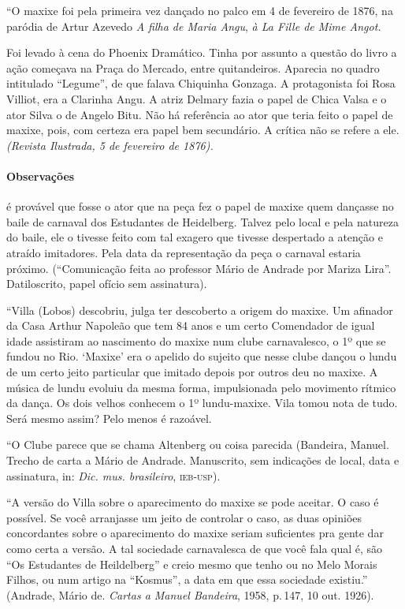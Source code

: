 ``O maxixe foi pela primeira vez dançado no palco em 4 de fevereiro de
1876, na paródia de Artur Azevedo \textit{A filha de Maria Angu}, \textit{à
La Fille de Mime Angot.}

Foi levado à cena do Phoenix Dramático. Tinha por assunto a questão do
livro a ação começava na Praça do Mercado, entre quitandeiros. Aparecia
no quadro intitulado ``Legume'', de que falava Chiquinha Gonzaga. A
protagonista foi Rosa Villiot, era a Clarinha Angu. A atriz Delmary
fazia o papel de Chica Valsa e o ator Silva o de Angelo Bitu. Não há
referência ao ator que teria feito o papel de maxixe, pois, com certeza
era papel bem secundário. A crítica não se refere a ele. \textit{(Revista
Ilustrada, 5 de fevereiro de 1876).}

\paragraph{Observações} é provável que fosse o ator que na peça fez o papel de
maxixe quem dançasse no baile de carnaval dos Estudantes de Heidelberg.
Talvez pelo local e pela natureza do baile, ele o tivesse feito com tal
exagero que tivesse despertado a atenção e atraído imitadores. Pela data
da representação da peça o carnaval estaria próximo. (``Comunicação
feita ao professor Mário de Andrade por Mariza Lira''. Datiloscrito,
papel ofício sem assinatura).

``Villa (Lobos) descobriu, julga ter descoberto a origem do maxixe. Um
afinador da Casa Arthur Napoleão que tem 84 anos e um certo Comendador
de igual idade assistiram ao nascimento do maxixe num clube
carnavalesco, o 1º que se fundou no Rio. `Maxixe' era o apelido do
sujeito que nesse clube dançou o lundu de um certo jeito particular que
imitado depois por outros deu no maxixe. A música de lundu evoluiu da
mesma forma, impulsionada pelo movimento rítmico da dança. Os dois
velhos conhecem o 1º lundu-maxixe. Vila tomou nota de tudo. Será mesmo
assim? Pelo menos é razoável.

``O Clube parece que se chama Altenberg ou coisa parecida (Bandeira,
Manuel. Trecho de carta a Mário de Andrade. Manuscrito, sem indicações
de local, data e assinatura, in: \textit{Dic. mus. brasileiro}, \textsc{ieb-usp}).

``A versão do Villa sobre o aparecimento do maxixe se pode aceitar. O
caso é possível. Se você arranjasse um jeito de controlar o caso, as
duas opiniões concordantes sobre o aparecimento do maxixe seriam
suficientes pra gente dar como certa a versão. A tal sociedade
carnavalesca de que você fala qual é, são ``Os Estudantes de Heildelberg''
e creio mesmo que tenho ou no Melo Morais Filhos, ou num artigo na
``Kosmus'', a data em que essa sociedade existiu.'' (Andrade, Mário de.
\textit{Cartas a Manuel Bandeira}, 1958, p.\,147, 10 out. 1926).

